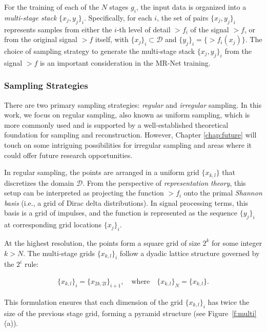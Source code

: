 For the training of each of the \( N \) stages \( g_i \), the input data is organized into a \textit{multi-stage stack} \(\{x_j, y_j\}_i\). Specifically, for each \( i \), the set of pairs \(\{x_j, y_j\}_i\) represents samples from either the \( i \)-th level of detail \(\gt{f}_i\) of the signal \(\gt{f}\), or from the original signal \(\gt{f}\) itself, with \(\{x_j\}_i \subset \mathcal{D}\) and \(\{y_j\}_i = \{\gt{f}_i(x_j)\}\). The choice of sampling strategy to generate the multi-stage stack \(\{x_j, y_j\}_i\) from the signal \(\gt{f}\) is an important consideration in the MR-Net training.


\subsubsection{Sampling Strategies}

There are two primary sampling strategies: \textit{regular} and \textit{irregular} sampling. In this work, we focus on regular sampling, also known as uniform sampling, which is more commonly used and is supported by a well-established theoretical foundation for sampling and reconstruction. However, Chapter \ref{chap:future} will touch on some intriguing possibilities for irregular sampling and areas where it could offer future research opportunities.

In regular sampling, the points are arranged in a uniform grid \(\{x_{k,l}\}\) that discretizes the domain \(\mathcal{D}\). From the perspective of \textit{representation theory}, this setup can be interpreted as projecting the function \(\gt{f}_i\) onto the primal \textit{Shannon basis} (i.e., a grid of Dirac delta distributions). In signal processing terms, this basis is a grid of impulses, and the function is represented as the sequence \(\{y_j\}_i\) at corresponding grid locations \(\{x_j\}_i\).

At the highest resolution, the points form a square grid of size \( 2^k \) for some integer \( k > N \). The multi-stage grids \(\{x_{k,l}\}_i\) follow a dyadic lattice structure governed by the \( 2^i \) rule:

\begin{align}
    \{x_{k,l}\}_i = \{x_{2k, 2l}\}_{i+1}, \quad \text{where} \quad \{x_{k,l}\}_N = \{x_{k,l}\}.
\end{align}


This formulation ensures that each dimension of the grid \(\{x_{k,l}\}_i\) has twice the size of the previous stage grid, forming a pyramid structure (see Figure~\ref{f:multi}(a)).


